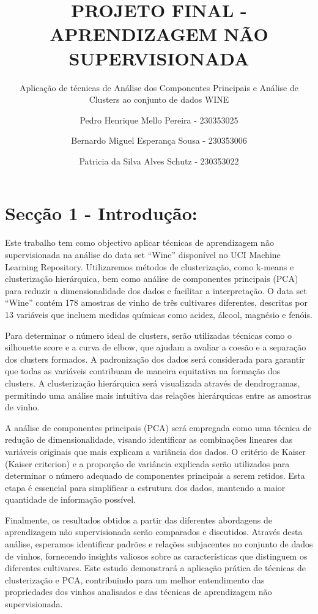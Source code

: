 \documentclass[
  letterpaper,
  DIV=11,
  numbers=noendperiod]{scrartcl}
\title{PROJETO FINAL - APRENDIZAGEM NÃO SUPERVISIONADA}
\subtitle{Aplicação de técnicas de Análise dos Componentes Principais e
Análise de Clusters ao conjunto de dados WINE}
\author{Pedro Henrique Mello Pereira - 230353025 \and Bernardo Miguel
Esperança Sousa - 230353006 \and Patricia da Silva Alves Schutz -
230353022}
\date{}
\renewcommand*\contentsname{Table of contents}
\newcommand\contentsname{Table of contents}
\begin{document}
\maketitle

\renewcommand*\contentsname{Sumário}
{
\hypersetup{linkcolor=}
\setcounter{tocdepth}{3}
\tableofcontents
}
\newpage{}

\section{Secção 1 -
Introdução:}\label{secuxe7uxe3o-1---introduuxe7uxe3o}

Este trabalho tem como objectivo aplicar técnicas de aprendizagem não
supervisionada na análise do data set ``Wine'' disponível no UCI Machine
Learning Repository. Utilizaremos métodos de clusterização, como k-means
e clusterização hierárquica, bem como análise de componentes principais
(PCA) para reduzir a dimensionalidade dos dados e facilitar a
interpretação. O data set ``Wine'' contém 178 amostras de vinho de três
cultivares diferentes, descritas por 13 variáveis que incluem medidas
químicas como acidez, álcool, magnésio e fenóis.

Para determinar o número ideal de clusters, serão utilizadas técnicas
como o silhouette score e a curva de elbow, que ajudam a avaliar a
coesão e a separação dos clusters formados. A padronização dos dados
será considerada para garantir que todas as variáveis contribuam de
maneira equitativa na formação dos clusters. A clusterização hierárquica
será visualizada através de dendrogramas, permitindo uma análise mais
intuitiva das relações hierárquicas entre as amostras de vinho.

A análise de componentes principais (PCA) será empregada como uma
técnica de redução de dimensionalidade, visando identificar as
combinações lineares das variáveis originais que mais explicam a
variância dos dados. O critério de Kaiser (Kaiser criterion) e a
proporção de variância explicada serão utilizados para determinar o
número adequado de componentes principais a serem retidos. Esta etapa é
essencial para simplificar a estrutura dos dados, mantendo a maior
quantidade de informação possível.

Finalmente, os resultados obtidos a partir das diferentes abordagens de
aprendizagem não supervisionada serão comparados e discutidos. Através
desta análise, esperamos identificar padrões e relações subjacentes no
conjunto de dados de vinhos, fornecendo insights valiosos sobre as
características que distinguem os diferentes cultivares. Este estudo
demonstrará a aplicação prática de técnicas de clusterização e PCA,
contribuindo para um melhor entendimento das propriedades dos vinhos
analisados e das técnicas de aprendizagem não supervisionada.
\end{document}

